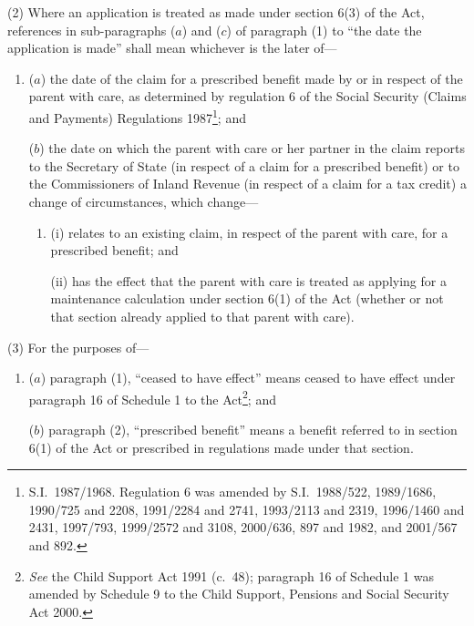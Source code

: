 \documentclass[12pt,a4paper]{article}
\begin{document}
(2) Where an application is treated as made under section 6(3) of the Act, references in sub-paragraphs ($a$)  and ($c$)  of paragraph (1) to “the date the application is made” shall mean whichever is the later of—
\begin{enumerate}\item[]
($a$) the date of the claim for a prescribed benefit made by or in respect of the parent with care, as determined by regulation 6 of the Social Security (Claims and Payments) Regulations 1987\footnote{S.I.\ 1987/1968. Regulation 6 was amended by S.I.\ 1988/522, 1989/1686, 1990/725 and 2208, 1991/2284 and 2741, 1993/2113 and 2319, 1996/1460 and 2431, 1997/793, 1999/2572 and 3108, 2000/636, 897 and 1982, and 2001/567 and 892.}; and

($b$) the date on which the parent with care or her partner in the claim reports to the Secretary of State (in respect of a claim for a prescribed benefit) or to the Commissioners of Inland Revenue (in respect of a claim for a tax credit) a change of circumstances, which change—
\begin{enumerate}\item[]
(i) relates to an existing claim, in respect of the parent with care, for a prescribed benefit; and

(ii) has the effect that the parent with care is treated as applying for a maintenance calculation under section 6(1) of the Act (whether or not that section already applied to that parent with care).
\end{enumerate}
\end{enumerate}

(3) For the purposes of—
\begin{enumerate}\item[]
($a$) paragraph (1), “ceased to have effect” means ceased to have effect under paragraph 16 of Schedule 1 to the Act\footnote{\emph{See} the Child Support Act 1991 (c.\ 48); paragraph 16 of Schedule 1 was amended by Schedule 9 to the Child Support, Pensions and Social Security Act 2000.}; and

($b$) paragraph (2), “prescribed benefit” means a benefit referred to in section 6(1) of the Act or prescribed in regulations made under that section.
\end{enumerate}

\end{document}
